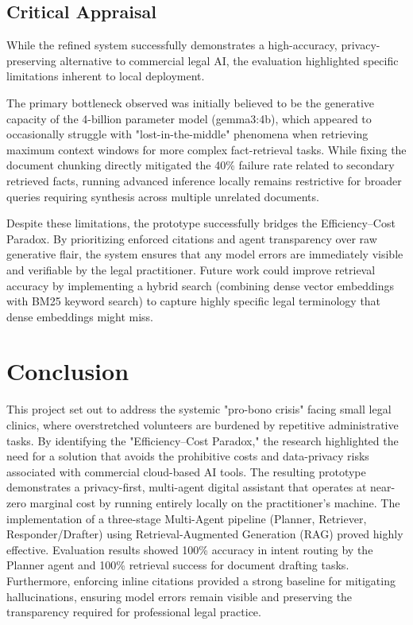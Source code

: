 \documentclass[11pt,a4paper]{article}
\begin{document}
\subsection{Critical Appraisal}

While the refined system successfully demonstrates a high-accuracy, privacy-preserving alternative to commercial legal AI, the evaluation highlighted specific limitations inherent to local deployment.

The primary bottleneck observed was initially believed to be the generative capacity of the 4-billion parameter model (gemma3:4b), which appeared to occasionally struggle with "lost-in-the-middle" phenomena when retrieving maximum context windows for more complex fact-retrieval tasks. While fixing the document chunking directly mitigated the 40\% failure rate related to secondary retrieved facts, running advanced inference locally remains restrictive for broader queries requiring synthesis across multiple unrelated documents.

Despite these limitations, the prototype successfully bridges the Efficiency--Cost Paradox. By prioritizing enforced citations and agent transparency over raw generative flair, the system ensures that any model errors are immediately visible and verifiable by the legal practitioner. Future work could improve retrieval accuracy by implementing a hybrid search (combining dense vector embeddings with BM25 keyword search) to capture highly specific legal terminology that dense embeddings might miss.

\section{Conclusion}
\label{sec:conclusion}

This project set out to address the systemic "pro-bono crisis" facing small legal clinics, where overstretched volunteers are burdened by repetitive administrative tasks. By identifying the "Efficiency--Cost Paradox," the research highlighted the need for a solution that avoids the prohibitive costs and data-privacy risks associated with commercial cloud-based AI tools. The resulting prototype demonstrates a privacy-first, multi-agent digital assistant that operates at near-zero marginal cost by running entirely locally on the practitioner's machine. The implementation of a three-stage Multi-Agent pipeline (Planner, Retriever, Responder/Drafter) using Retrieval-Augmented Generation (RAG) proved highly effective. Evaluation results showed 100\% accuracy in intent routing by the Planner agent and 100\% retrieval success for document drafting tasks. Furthermore, enforcing inline citations provided a strong baseline for mitigating hallucinations, ensuring model errors remain visible and preserving the transparency required for professional legal practice.
\end{document}
